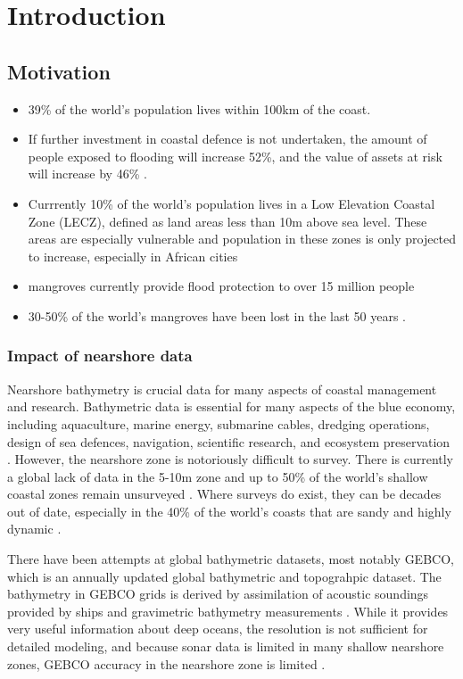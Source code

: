 
\chapter{Introduction}


\section{Motivation}
\begin{itemize}
      \item 39\% of the world's population lives within 100km of the coast.\parencite{Magdalena2021}
      \item If further investment in coastal defence is not undertaken, the amount of people exposed to flooding will increase 52\%, and the value of assets at risk will increase by 46\% \parencite{Kirezci2020}.
      \item Currrently 10\% of the world's population lives in a Low Elevation Coastal Zone (LECZ), defined as land areas less than 10m above sea level. These areas are especially vulnerable and population in these zones is only projected to increase, especially in African cities \parencite{Neumann2015,Lichter2011}
      \item mangroves currently provide flood protection to over 15 million people \parencite{Menendez2020}
      \item 30-50\% of the world's mangroves have been lost in the last 50 years \parencite{}. 
\end{itemize}
\subsection{Impact of nearshore data}

Nearshore bathymetry is crucial data for many aspects of coastal management and research. Bathymetric data is essential for many aspects of the blue economy, including aquaculture, marine energy, submarine cables, dredging operations, design of sea defences, navigation, scientific research, and ecosystem preservation \parencite{Cesbron2021,Ashphaq2021}. However, the nearshore zone is notoriously difficult to survey. There is currently a global lack of data in the 5-10m zone \parencite{Albright2021} and up to 50\% of the world's shallow coastal zones remain unsurveyed \parencite{IHO/OHI2022}. Where surveys do exist, they can be decades out of date, especially in the 40\% of the world's coasts that are sandy and highly dynamic \parencite{Almar2021e}.  

There have been attempts at global bathymetric datasets, most notably GEBCO, which is an annually updated global bathymetric and topograhpic dataset. The bathymetry in GEBCO grids is derived by assimilation of acoustic soundings provided by ships and gravimetric bathymetry measurements \parencite{Cesbron2021}. While it provides very useful information about deep oceans, the resolution is not sufficient for detailed modeling, and because sonar data is limited in many shallow nearshore zones, GEBCO accuracy in the nearshore zone is limited \parencite{add}.

